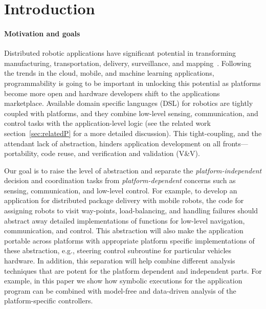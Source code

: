 \section{Introduction}
\label{sec:intro}

\paragraph{Motivation and goals}
Distributed robotic applications have significant potential in transforming manufacturing, transportation, delivery, surveillance, and mapping~\cite{}. Following the trends in the cloud, mobile, and machine learning applications, programmability is going to be important in unlocking this potential as platforms become more open and hardware developers shift to the applications marketplace. Available domain specific languages (DSL) for robotics are tightly coupled with platforms, and they combine low-level sensing, communication, and control tasks with the application-level logic (see the related work section~\ref{sec:relatedP} for a more detailed discussion). This tight-coupling, and the attendant lack of abstraction, hinders  application development on all fronts---  portability, code reuse, and verification and validation (V\&V).


Our goal is to raise the level of abstraction and separate the \emph{platform-independent} decision and coordination tasks from \emph{platform-dependent} concerns such as sensing, communication, and low-level control.	 For example, to develop an application for distributed package delivery with mobile robots, the code for assigning robots to visit way-points, load-balancing, and handling failures should abstract away detailed implementations of functions for low-level navigation, communication, and control. This abstraction will also  make the application  portable across platforms with appropriate platform specific implementations of these abstraction, e.g., steering control subroutine for particular vehicles hardware.
%
In addition, this separation will help combine different analysis techniques that are potent for the platform dependent and independent parts. For example, in this paper we show how symbolic executions for the application program can be combined with  model-free and data-driven analysis of the platform-specific controllers. 


